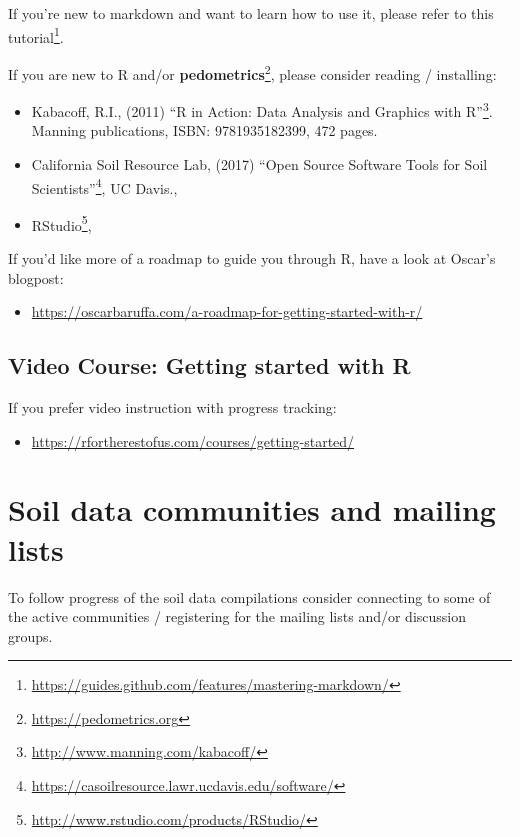 \documentclass[
  graybox,natbib,nospthms]{svmono}
\providecommand{\tightlist}{%
  \setlength{\itemsep}{0pt}\setlength{\parskip}{0pt}}
\providecommand{\tightlist}{\setlength{\itemsep}{0pt}\setlength{\parskip}{0pt}}
\renewcommand{\href}[2]{#2 (\url{#1})}
\renewcommand{\href}[2]{#2\footnote{\url{#1}}}
\begin{document}
If you're new to markdown and want to learn how to use it, please refer to \href{https://guides.github.com/features/mastering-markdown/}{this tutorial}.

If you are new to R and/or \href{https://pedometrics.org}{\textbf{pedometrics}}, please consider reading / installing:

\begin{itemize}
\tightlist
\item
  Kabacoff, R.I., (2011) \href{http://www.manning.com/kabacoff/}{``R in Action: Data Analysis and Graphics with R''}. Manning publications, ISBN: 9781935182399, 472 pages.
\item
  California Soil Resource Lab, (2017) \href{https://casoilresource.lawr.ucdavis.edu/software/}{``Open Source Software Tools for Soil Scientists''}, UC Davis.,\\
\item
  \href{http://www.rstudio.com/products/RStudio/}{RStudio},
\end{itemize}

If you'd like more of a roadmap to guide you through R, have a look at Oscar's blogpost:

\begin{itemize}
\tightlist
\item
  \url{https://oscarbaruffa.com/a-roadmap-for-getting-started-with-r/}
\end{itemize}

\hypertarget{video-course-getting-started-with-r}{%
\section{Video Course: Getting started with R}\label{video-course-getting-started-with-r}}

If you prefer video instruction with progress tracking:

\begin{itemize}
\tightlist
\item
  \url{https://rfortherestofus.com/courses/getting-started/}
\end{itemize}

\hypertarget{soil-data-communities-and-mailing-lists}{%
\chapter{Soil data communities and mailing lists}\label{soil-data-communities-and-mailing-lists}}

To follow progress of the soil data compilations consider connecting to some of the
active communities / registering for the mailing lists and/or discussion groups.
\end{document}

